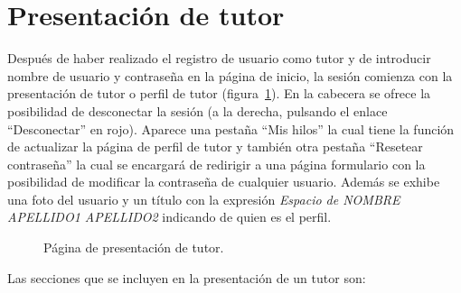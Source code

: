 \documentclass[a4paper, 12pt]{book}
\begin{document}
\section{Presentaci\'on de tutor}
\label{app:presentaciontutor}
Despu\'es de haber realizado el registro de usuario como tutor y de introducir nombre de usuario y contrase\~na en la p\'agina de inicio, la sesi\'on 
comienza con la presentaci\'on de tutor o perfil de tutor (figura~\ref{figura:tutor}). En la cabecera se ofrece la posibilidad de desconectar la sesi\'on (a la derecha, pulsando el 
enlace ``Desconectar'' en rojo). Aparece una pesta\~na ``Mis hilos'' la cual tiene la funci\'on de actualizar la p\'agina de perfil 
de tutor y tambi\'en otra pesta\~na ``Resetear contrase\~na'' la cual se encargar\'a de redirigir a una p\'agina formulario con la posibilidad de
modificar la contrase\~na de cualquier usuario. Adem\'as se exhibe una foto del usuario y un t\'itulo con la expresi\'on 
\textit{Espacio de NOMBRE APELLIDO1 APELLIDO2} indicando de quien es el perfil.

\begin{figure}[htbp] 
  \centering
  \caption{P\'agina de presentaci\'on de tutor.}
  \label{figura:tutor}
\end{figure}

Las secciones que se incluyen en la presentaci\'on de un tutor son:
\end{document}
